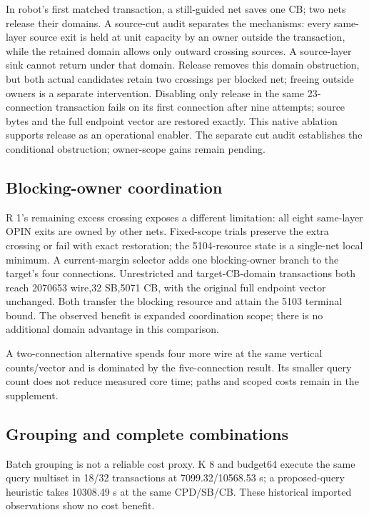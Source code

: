 \documentclass[conference,10pt]{IEEEtran}
\begin{document}
In robot's first matched transaction, a still-guided net saves one CB; two nets release their domains. A source-cut audit separates the mechanisms: every same-layer source exit is held at unit capacity by an owner outside the transaction, while the retained domain allows only outward crossing sources. A source-layer sink cannot return under that domain. Release removes this domain obstruction, but both actual candidates retain two crossings per blocked net; freeing outside owners is a separate intervention. Disabling only release in the same 23-connection transaction fails on its first connection after nine attempts; source bytes and the full endpoint vector are restored exactly. This native ablation supports release as an operational enabler. The separate cut audit establishes the conditional obstruction; owner-scope gains remain pending.

\subsection{Blocking-owner coordination}
R 1's remaining excess crossing exposes a different limitation: all eight same-layer OPIN exits are owned by other nets. Fixed-scope trials preserve the extra crossing or fail with exact restoration; the 5104-resource state is a single-net local minimum. A current-margin selector adds one blocking-owner branch to the target's four connections. Unrestricted and target-CB-domain transactions both reach 2070653 wire,32 SB,5071 CB, with the original full endpoint vector unchanged. Both transfer the blocking resource and attain the 5103 terminal bound. The observed benefit is expanded coordination scope; there is no additional domain advantage in this comparison.

A two-connection alternative spends four more wire at the same vertical counts/vector and is dominated by the five-connection result. Its smaller query count does not reduce measured core time; paths and scoped costs remain in the supplement.

\subsection{Grouping and complete combinations}
Batch grouping is not a reliable cost proxy. K 8 and budget64 execute the same query multiset in 18/32 transactions at 7099.32/10568.53 s; a proposed-query heuristic takes 10308.49 s at the same CPD/SB/CB. These historical imported observations show no cost benefit.
\end{document}
